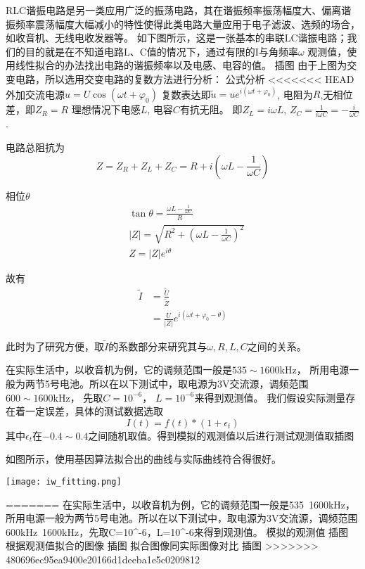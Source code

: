 \documentclass[a4paper]{article}
\begin{document}
RLC谐振电路是另一类应用广泛的振荡电路，其在谐振频率振荡幅度大、偏离谐振频率震荡幅度大幅减小的特性使得此类电路大量应用于电子滤波、选频的场合，如收音机、无线电收发器等。
如下图所示，这是一张基本的串联LC谐振电路；我们的目的就是在不知道电路L、C值的情况下，通过有限的I与角频率$\omega$ 观测值，使用线性拟合的办法找出电路的谐振频率以及电感、电容的值。
插图
由于上图为交变电路，所以选用交变电路的复数方法进行分析：
公式分析
<<<<<<< HEAD
外加交流电源$u = U\cos(\omega t + \varphi_0)$ 复数表达即$\tilde{u} = u e^{i(\omega t + \varphi_0)}$,
电阻为$R$,无相位差，即$Z_R = R$
理想情况下电感$L$, 电容$C$有抗无阻。
即$Z_L = i\omega L$, $Z_C  = \frac{1}{i\omega C} = - \frac{i}{\omega C}$ .

电路总阻抗为
\begin{equation}
	Z = Z_R + Z_L + Z_C = R + i(\omega L - \frac{1}{\omega C})
\end{equation}

相位$\theta$
\begin{align}
	& \tan \theta = \frac{\omega L - \frac{1}{\omega C}}{R} \\
	& |Z| = \sqrt{R^2 + (\omega L - \frac{1}{\omega C})^2} \\
	& Z = |Z| e^{i\theta}
\end{align}

故有
\begin{equation}
	\begin{split}
		\tilde{I} &= \frac{\tilde{U}}{\tilde{Z}} \\
				&= \frac{U}{|Z|} e^{i(\omega t + \varphi_0 - \theta)}
	\end{split}
\end{equation}

此时为了研究方便，取$\tilde{I}$的系数部分来研究其与$\omega,R,  L, C$之间的关系。

在实际生活中，以收音机为例，它的调频范围一般是$535 \sim 1600 \text{kHz}$，
所用电源一般为两节5号电池。所以在以下测试中，取电源为$3 \text{V}$交流源，调频范围$600 \sim 1600 \text{kHz}$，
先取$C=10^{-6}$， $L=10^{-6}$来得到观测值。 
我们假设实际测量存在着一定误差，具体的测试数据选取
\begin{equation}
	I(t) = f(t) * (1 + \epsilon_t)
\end{equation}
其中$\epsilon_t$在$-0.4 \sim 0.4$之间随机取值。得到模拟的观测值以后进行测试观测值取插图

如图所示，使用基因算法拟合出的曲线与实际曲线符合得很好。

\begin{center}
\texttt{[image: iw\_fitting.png]}
\end{center}
=======
在实际生活中，以收音机为例，它的调频范围一般是535~1600kHz，所用电源一般为两节5号电池。所以在以下测试中，取电源为3V交流源，调频范围600kHz~1600kHz，先取C=10^{-6}，L=10^{-6}来得到观测值。
模拟的观测值
插图
根据观测值拟合的图像
插图
拟合图像同实际图像对比
插图
>>>>>>> 480696ec95ea9400e20166d1deeba1e5c0209812
\end{document}
